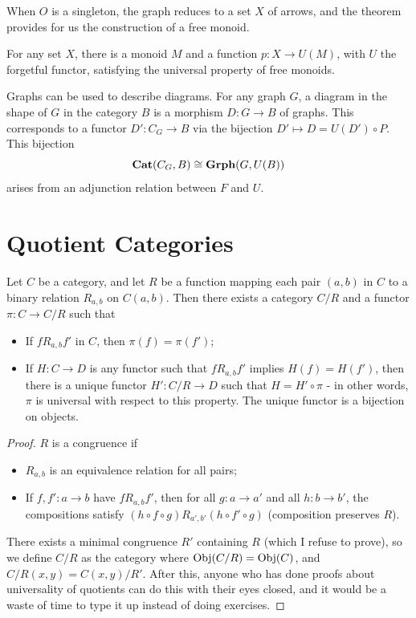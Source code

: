When $O$ is a singleton, the graph reduces to a set $X$ of arrows, and the theorem provides for us the construction of a free monoid.

\begin{corollary}\label{cor:2.1}
	For any set $X$, there is a monoid $M$ and a function $p : X \to U(M)$, with $U$ the forgetful functor, satisfying the universal property of free monoids.
\end{corollary}

Graphs can be used to describe diagrams. For any graph $G$, a diagram in the shape of $G$ in the category $B$ is a morphism $D : G \to B$ of graphs. This corresponds to a functor $D': C_G \to B$ via the bijection $D'\mapsto D=U(D')\circ P$. This bijection
\[
	\mathbf{Cat} (C_G,B)\cong \mathbf{Grph} (G,U(B))
\]
arises from an adjunction relation between $F$ and $U$.

\section{Quotient Categories}

\begin{proposition}\label{prp:2.3}
	Let $C$ be a category, and let $R$ be a function mapping each pair $(a,b)$ in $C$ to a binary relation $R_{a,b} $ on $C(a,b)$. Then there exists a category $C/R$ and a functor $\pi : C \to C/R$ such that
	\begin{itemize}
		\item If $fR_{a,b} f'$ in $C$, then $\pi (f)=\pi (f')$;
		\item If $H : C \to D$ is any functor such that $fR_{a,b} f'$ implies $H(f)=H(f')$, then there is a unique functor $H': C/R \to D$ such that $H=H'\circ \pi $ - in other words, $\pi $ is universal with respect to this property. The unique functor is a bijection on objects.
	\end{itemize}
\end{proposition}
\begin{proof}
	$R$ is a congruence if
	\begin{itemize}
		\item $R_{a,b} $ is an equivalence relation for all pairs;
		\item If $f,f': a \to b$ have $fR_{a,b} f'$, then for all $g : a \to a'$ and all $h : b \to b'$, the compositions satisfy $(h\circ f\circ g)R_{a',b'} (h\circ f'\circ g)$ (composition preserves $R$).
	\end{itemize}
	There exists a minimal congruence $R'$ containing $R$ (which I refuse to prove), so we define $C/R$ as the category where $\operatorname{Obj}(C/R) =\operatorname{Obj}(C) $, and $C/R(x,y)=C(x,y) /R'$. After this, anyone who has done proofs about universality of quotients can do this with their eyes closed, and it would be a waste of time to type it up instead of doing exercises.
\end{proof}

